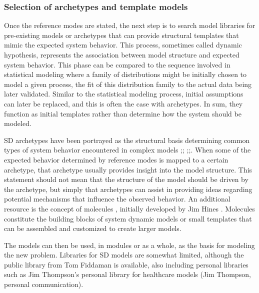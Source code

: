 \documentclass[11pt]{article}
\begin{document}
\subsubsection {Selection of archetypes and template models}

Once the reference modes are stated, the next step is to search model libraries for pre-existing models or archetypes that can provide structural templates that mimic the expected system behavior.  This process, sometimes called dynamic hypothesis, represents the association between model structure and expected system behavior.  This phase can be compared to the sequence involved in statistical modeling where a family of distributions might be initially chosen to model a given process, the fit of this distribution family to the actual data being later validated.  Similar to the statistical modeling process, initial assumptions can later be replaced, and this is often the case with archetypes.  In sum, they function as initial templates rather than determine how the system should be modeled.

SD archetypes have been portrayed as the structural basis determining common types of system behavior encountered in complex models \cite{Wolstenholme2003};\cite{Wolstenholme2004}; \cite{Braun2002};\cite {systemdynamicsArchetypes};\cite {systemsthinking}.  When some of the expected behavior determined by reference modes is mapped to a certain archetype, that archetype usually provides insight into the model structure.  This statement should not mean that the structure of the model should be driven by the archetype, but simply that archetypes can assist in providing ideas regarding potential mechanisms that influence the observed behavior.  An additional resource is the concept of molecules \cite{vensimmolecule},  initially developed by Jim Hines \cite{Hines1983}.  Molecules constitute the building blocks of system dynamic models or small templates that can be assembled and customized to create larger models.

The models can then be used, in modules or as a whole, as the basis for modeling the new problem. Libraries for SD models are somewhat limited, although the public library from Tom Fiddaman \cite{metasd} is available, also including personal libraries such as Jim Thompson's personal library for healthcare models (Jim Thompson, personal communication).  
\end{document}

